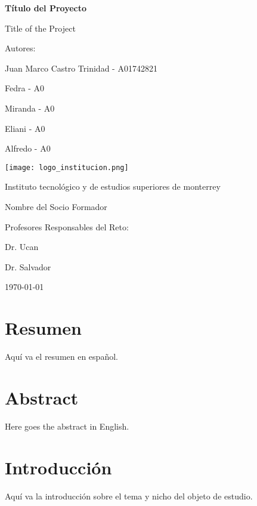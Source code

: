 \documentclass[a4paper,12pt]{report}
\begin{document}
\begin{titlepage}
    \centering
    {\Huge \bfseries Título del Proyecto \par}
    {\Large Title of the Project \par}
    \vspace{1cm}
    {\Large Autores: \par}
    \vspace{0.5cm}
    {\large Juan Marco Castro Trinidad - A01742821 \par}
    {\large Fedra - A0 \par}
    {\large Miranda - A0 \par}
    {\large Eliani - A0 \par}
    {\large Alfredo - A0 \par}
    \vfill
    \texttt{[image: logo\_institucion.png]} \par
    \vspace{0.5cm}
    {\Large Instituto tecnológico y de estudios superiores de monterrey  \par}
    {\Large Nombre del Socio Formador \par}
    \vfill
    {\Large Profesores Responsables del Reto: \par}
    {\large Dr. Ucan \par}
    {\large Dr. Salvador \par}
    \vfill
    {\large \today \par}
\end{titlepage}

\tableofcontents
\newpage

\chapter*{Resumen}
Aquí va el resumen en español.

\chapter*{Abstract}
Here goes the abstract in English.

\chapter{Introducción}
Aquí va la introducción sobre el tema y nicho del objeto de estudio.

\end{document}
